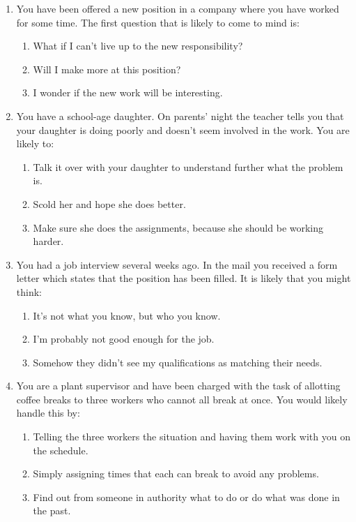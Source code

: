 \begin{enumerate}
    \item You have been offered a new position in a company where you have worked for some time. The first question that is likely to come to mind is:
    \begin{enumerate}
        \item What if I can't live up to the new responsibility?
        \item Will I make more at this position?
        \item I wonder if the new work will be interesting.
    \end{enumerate}
    \item You have a school-age daughter. On parents' night the teacher tells you that your daughter is doing poorly and doesn't seem involved in the work. You are likely to:
    \begin{enumerate}
        \item Talk it over with your daughter to understand further what the problem is.
        \item Scold her and hope she does better.
        \item Make sure she does the assignments, because she should be working harder.
    \end{enumerate}
    \item You had a job interview several weeks ago. In the mail you received a form letter which states that the position has been filled. It is likely that you might think:
    \begin{enumerate}
        \item It's not what you know, but who you know.
        \item I'm probably not good enough for the job.
        \item Somehow they didn't see my qualifications as matching their needs.
    \end{enumerate}
    \item You are a plant supervisor and have been charged with the task of allotting coffee breaks to three workers who cannot all break at once. You would likely handle this by:
    \begin{enumerate}
        \item Telling the three workers the situation and having them work with you on the schedule.
        \item Simply assigning times that each can break to avoid any problems.
        \item Find out from someone in authority what to do or do what was done in the past.

\end{enumerate}
\end{enumerate}
